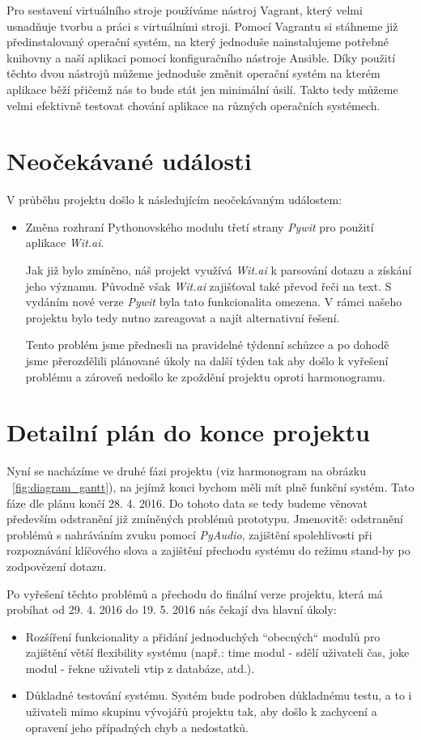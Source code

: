 \documentclass[12pt,a4paper]{article}
\begin{document}
Pro sestavení virtuálního stroje používáme nástroj Vagrant, který velmi usnadňuje tvorbu a práci s virtuálními stroji. Pomocí Vagrantu si stáhneme již předinstalovaný operační systém, na který jednoduše nainstalujeme potřebné knihovny a naší aplikaci pomocí konfiguračního nástroje Ansible. Díky použití těchto dvou nástrojů můžeme jednoduše změnit operační systém na kterém aplikace běží přičemž nás to bude stát jen minimální úsilí. Takto tedy můžeme velmi efektivně testovat chování aplikace na různých operačních systémech.

\section{Neočekávané události}
V průběhu projektu došlo k následujícím neočekávaným událostem:
\begin{itemize}
	\item Změna rozhraní Pythonovského modulu třetí strany \textit{Pywit} pro použití aplikace \textit{Wit.ai}.
	
	Jak již bylo zmíněno, náš projekt využívá \textit{Wit.ai} k parsování dotazu a získání jeho významu. Původně však \textit{Wit.ai} zajišťoval také převod řeči na text. S vydáním nové verze \textit{Pywit} byla tato funkcionalita omezena. V rámci našeho projektu bylo tedy nutno zareagovat a najít alternativní řešení. 
	
	Tento problém jsme přednesli na pravidelné týdenní schůzce a po dohodě jsme přerozdělili plánované úkoly na další týden tak aby došlo k vyřešení problému a zároveň nedošlo ke zpoždění projektu oproti harmonogramu.
	

\end{itemize}

\section{Detailní plán do konce projektu}
Nyní se nacházíme ve druhé fázi projektu (viz harmonogram na obrázku ~\ref{fig:diagram_gantt}), na jejímž konci bychom měli mít plně funkční systém. Tato fáze dle plánu končí 28. 4. 2016. Do tohoto data se tedy budeme věnovat především odstranění již zmíněných problémů prototypu. Jmenovitě: odstranění problémů s nahráváním zvuku pomocí \textit{PyAudio}, zajištění spolehlivosti při rozpoznávání klíčového slova a zajištění přechodu systému do režimu stand-by po zodpovězení dotazu.

Po vyřešení těchto problémů a přechodu do finální verze projektu, která má probíhat od 29. 4. 2016 do 19. 5. 2016 nás čekají dva hlavní úkoly: 
\begin{itemize}
	\item Rozšíření funkcionality a přidání jednoduchých “obecných“ modulů pro zajištění větší flexibility systému (např.: time modul - sdělí uživateli čas, joke modul - řekne uživateli vtip z databáze, atd.).
	\item Důkladné testování systému. Systém bude podroben důkladnému testu, a to i uživateli mimo skupinu vývojářů projektu tak, aby došlo k zachycení a opravení jeho případných chyb a nedostatků.
\end{itemize}
\end{document}
